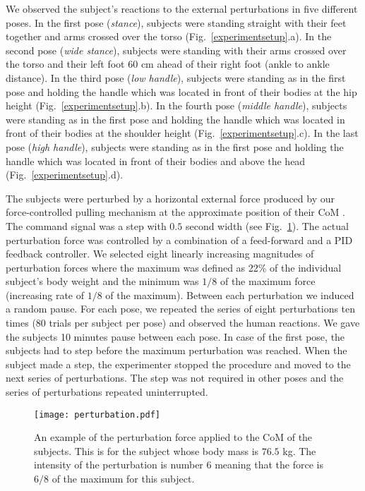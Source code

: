 We observed the subject’s reactions to the external perturbations in five
different poses.  In the first pose (\textit{stance}), subjects were standing
straight with their feet together and arms crossed over the torso
(Fig.~\ref{experimentsetup}.a).  In the second pose (\textit{wide stance}),
subjects were standing with their arms crossed over the torso and their left
foot $60$ cm ahead of their right foot (ankle to ankle distance).  In the
third pose (\textit{low handle}), subjects were standing as in the first pose
and holding the handle which was located in front of their bodies at the hip
height (Fig.~\ref{experimentsetup}.b).  In the fourth pose (\textit{middle
	handle}), subjects were standing as in the first pose and holding the handle
which was located in front of their bodies at the shoulder height
(Fig.~\ref{experimentsetup}.c).  In the last pose (\textit{high handle}),
subjects were standing as in the first pose and holding the handle which was
located in front of their bodies and above the head
(Fig.~\ref{experimentsetup}.d).

The subjects were perturbed by a horizontal external force produced by our
force-controlled pulling mechanism \cite{Peternel&Babic13} at the approximate
position of their CoM \cite{Gardetal04}.  The command signal was a step with
$0.5$ second width (see Fig.~\ref{perturbations}).  The actual perturbation
force was controlled by a combination of a feed-forward and a PID feedback
controller.  We selected eight linearly increasing magnitudes of perturbation
forces where the maximum was defined as 22\% of the individual subject's body
weight and the minimum was $1/8$ of the maximum force (increasing rate of
$1/8$ of the maximum).  Between each perturbation we induced a random pause.
For each pose, we repeated the series of eight perturbations ten times (80
trials per subject per pose) and observed the human reactions.  We gave the
subjects 10 minutes pause between each pose.  In case of the first pose, the
subjects had to step before the maximum perturbation was reached.  When the
subject made a step, the experimenter stopped the procedure and moved to the
next series of perturbations.  The step was not required in other poses and
the series of perturbations repeated uninterrupted.
\begin{figure}
	\centering
	\texttt{[image: perturbation.pdf]}
	\caption{An example of the perturbation force applied to the CoM of the
		subjects.  This is for the subject whose body mass is $76.5$ kg.  The
		intensity of the perturbation is number $6$ meaning that the force is
		$6/8$ of the maximum for this subject.}
	\label{perturbations}
\end{figure}


